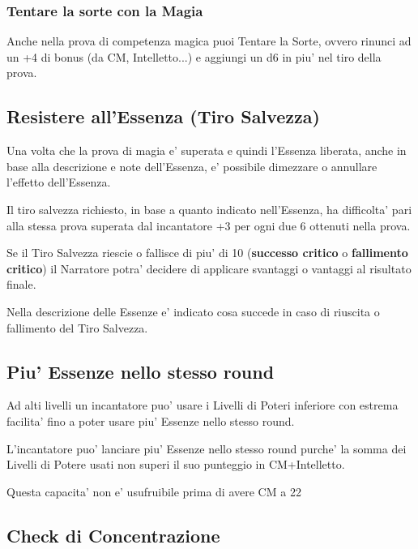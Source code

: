\documentclass[a4paper,11pt,twoside,openany]{book}
\begin{document}
	\subsubsection{Tentare la sorte con la Magia}
	
	\label{tentare-la-sorte-con-la-magia}
	
	Anche nella prova di competenza magica puoi Tentare la Sorte, ovvero rinunci ad un +4 di bonus (da CM, Intelletto...) e aggiungi un d6 in piu' nel tiro della prova.
	
	\subsection{Resistere all'Essenza (Tiro Salvezza)}
	
	\label{resistere-allessenza-tiro-salvezza}
	
	Una volta che la prova di magia e' superata e quindi l'Essenza liberata, anche in base alla descrizione e note dell'Essenza, e' possibile dimezzare o annullare l'effetto dell'Essenza.
	
	Il tiro salvezza richiesto, in base a quanto indicato nell'Essenza, ha difficolta' pari alla stessa prova superata dal incantatore +3 per ogni due 6 ottenuti nella prova.
	
	Se il Tiro Salvezza riescie o fallisce di piu' di 10 (\textbf{successo critico} o \textbf{fallimento critico}) il Narratore potra' decidere di applicare svantaggi o vantaggi al risultato finale.
	
	Nella descrizione delle Essenze e' indicato cosa succede in caso di riuscita o fallimento del Tiro Salvezza.
	
	\subsection{Piu' Essenze nello stesso round}
	
	Ad alti livelli un incantatore puo' usare i Livelli di Poteri inferiore con estrema facilita' fino a poter usare piu' Essenze nello stesso round.
	
	L'incantatore puo' lanciare piu' Essenze nello stesso round purche' la somma dei Livelli di Potere usati non superi il suo punteggio in CM+Intelletto.
	
	Questa capacita' non e' usufruibile prima di avere CM a 22
	
	\subsection{Check di Concentrazione}
	
\end{document}
